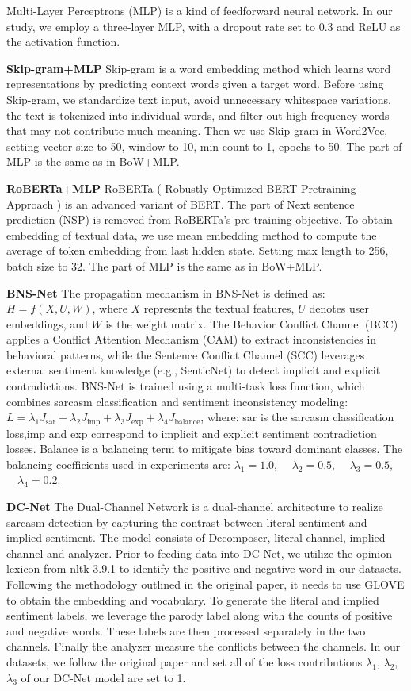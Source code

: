 Multi-Layer Perceptrons (MLP) is a kind of feedforward neural network. In our study, we employ a three-layer MLP, with a dropout rate set to 0.3 and ReLU as the activation function. 

\textbf{Skip-gram+MLP} \citep{Skip-gram}
Skip-gram is a word embedding method which learns word representations by predicting context words given a target word. Before using Skip-gram, we standardize text input, avoid unnecessary whitespace variations, the text is tokenized into individual words, and filter out high-frequency words that may not contribute much meaning. Then we use Skip-gram in Word2Vec, setting vector size to 50, window to 10, min count to 1, epochs to 50.
The part of MLP is the same as in BoW+MLP.

\textbf{RoBERTa+MLP} \citep{RoBERTa}
RoBERTa ( Robustly Optimized BERT Pretraining Approach ) is an advanced variant of BERT. The part of Next sentence prediction (NSP) is removed from RoBERTa's pre-training objective. To obtain embedding of textual data, we use mean embedding method to compute the average of token embedding from last hidden state. Setting max length to 256, batch size to 32. The part of MLP is the same as in BoW+MLP.

\textbf{BNS-Net} \citep{BNS-Net}
The propagation mechanism in BNS-Net is defined as:$H = f(X, U, W)$, where $X$ represents the textual features, $U$ denotes user embeddings, and $W$ is the weight matrix. The Behavior Conflict Channel (BCC) applies a Conflict Attention Mechanism (CAM) to extract inconsistencies in behavioral patterns, while the Sentence Conflict Channel (SCC) leverages external sentiment knowledge (e.g., SenticNet) to detect implicit and explicit contradictions. BNS-Net is trained using a multi-task loss function, which combines sarcasm classification and sentiment inconsistency modeling:
$L = \lambda_1 J_{\text{sar}} + \lambda_2 J_{\text{imp}} + \lambda_3 J_{\text{exp}} + \lambda_4 J_{\text{balance}}$, where: sar is the sarcasm classification loss,imp and exp correspond to implicit and explicit sentiment contradiction losses. Balance is a balancing term to mitigate bias toward dominant classes. The balancing coefficients used in experiments are: $\lambda_1 = 1.0$, $\quad \lambda_2 = 0.5$, $\quad \lambda_3 = 0.5$, $\quad \lambda_4 = 0.2$.

\textbf{DC-Net} \citep{DC-Net}
The Dual-Channel Network is a dual-channel architecture to realize sarcasm detection by capturing the contrast between literal sentiment and implied sentiment. The model consists of Decomposer, literal channel, implied channel and analyzer. Prior to feeding data into DC-Net, we utilize the opinion lexicon from nltk 3.9.1 to identify the positive and negative word in our datasets. Following the methodology outlined in the original paper, it needs to use GLOVE to obtain the embedding and vocabulary. To generate the literal and implied sentiment labels, we leverage the parody label along with the counts of positive and negative words. These labels are then processed separately in the two channels. Finally the analyzer measure the conflicts between the channels. In our datasets, we follow the original paper and set all of the loss contributions \(\lambda_1\), \(\lambda_2\), \(\lambda_3\) of our DC-Net model are set to 1.

